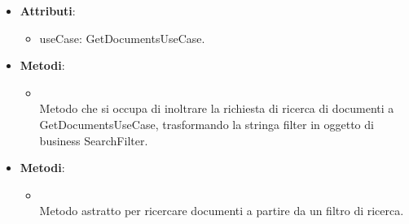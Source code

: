 \documentclass[10pt, a4paper]{article}
\begin{document}
\label{GetDocumentsControllerDettaglio}
\begin{itemize}
    \item \textbf{Attributi}:
    \begin{itemize}
        \item useCase: GetDocumentsUseCase.
    \end{itemize}
    \item \textbf{Metodi}:
    \begin{itemize}
        \item {}\\
        Metodo che si occupa di inoltrare la richiesta di ricerca di documenti a GetDocumentsUseCase, trasformando la stringa filter in oggetto di business SearchFilter.
    \end{itemize}
\end{itemize}

\label{GetDocumentsUseCaseDettaglio}
\begin{itemize}
    \item \textbf{Metodi}:
    \begin{itemize}
        \item {}\\
        Metodo astratto per ricercare documenti a partire da un filtro di ricerca.
    \end{itemize}
\end{itemize}
\end{document}
